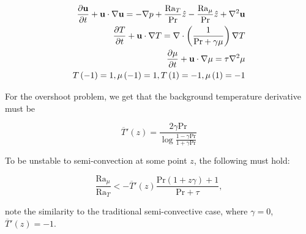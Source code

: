 
\begin{align}
	\frac{\partial \mathbf{u}}{\partial t}+\mathbf{u}\cdot\nabla\mathbf{u}=-\nabla{p}+\frac{\mathrm{Ra}_{T}}{\mathrm{Pr}}\hat{z}-\frac{\mathrm{Ra}_{\mu}}{\mathrm{Pr}}\hat{z}+\nabla^{2}\mathbf{u}\\
	\frac{\partial T}{\partial t}+\mathbf{u}\cdot\nabla{T}=\nabla\cdot\left(\frac{1}{\mathrm{Pr}+\gamma\mu}\right)\nabla{T}\\
	\frac{\partial \mu}{\partial t}+\mathbf{u}\cdot\nabla{\mu}=\tau\nabla^{2}\mu\\
	T\left(-1\right)=1,\mu\left(-1\right)=1,T\left(1\right)=-1,\mu\left(1\right)=-1
\end{align}

For the overshoot problem, we get that the background temperature derivative must be

\begin{equation}
	\overline{T}'\left(z\right)=\frac{2\gamma\mathrm{Pr}}{\log{\frac{1-\gamma\mathrm{Pr}}{1+\gamma\mathrm{Pr}}}}
\end{equation}

To be unstable to semi-convection at some point $z$, the following must hold:

\begin{equation}
	\frac{\mathrm{Ra}_{\mu}}{\mathrm{Ra}_{T}}<-\overline{T}'\left(z\right)\frac{\mathrm{Pr}\left(1+z\gamma\right)+1}{\mathrm{Pr}+\tau},
\end{equation}

note the similarity to the traditional semi-convective case, where $\gamma=0$, $\overline{T}'(z)=-1$.

